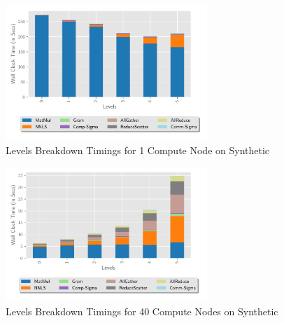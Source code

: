 
\begin{figure}
\begin{center}
\includegraphics[height=2in, width=\columnwidth]{plots/synthetic_sequential_level_breakdown.pdf}
\caption{Levels Breakdown Timings for 1 Compute Node on Synthetic}
\label{fig:seqlevelbreakdown}
\end{center}
\end{figure}

\begin{figure}
\begin{center}
\includegraphics[height=2in, width=\columnwidth]{plots/synthetic_parallel_level_breakdown.pdf}
\caption{Levels Breakdown Timings for 40 Compute Nodes on Synthetic}
\label{fig:parallellevelbreakdown}
\end{center}
\end{figure}




